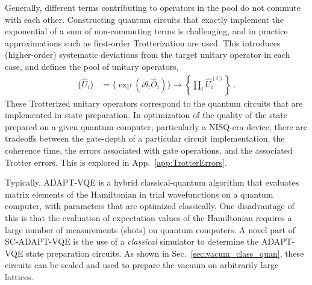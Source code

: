 \documentclass[aps, pra, onecolumn, tightenlines, letterpaper, amsmath, amssymb, preprintnumbers, floatfix, longbibliography, nofootinbib]{revtex4-2}
\begin{document}
Generally,
different terms contributing to operators
in the pool 
do not commute with each other.
Constructing quantum circuits that exactly implement the exponential of a sum of non-commuting terms is challenging, and in practice approximations such as first-order Trotterization are used.
This introduces (higher-order) systematic deviations from the target unitary operator in each case, and 
defines the pool of unitary operators,
%
\begin{align}
     \{ \hat{U}_i \} & = \{ {\exp}(i \theta_i \hat{O}_i) \}\rightarrow \left \{ \prod\limits_t \hat{U}_i^{(t)} \right \}
    \ .
    \label{eq:TrotOp}
\end{align}
%
These Trotterized unitary operators correspond to the quantum circuits 
that are implemented in state preparation.
In optimization of the quality of the state prepared on a given quantum computer, 
particularly a NISQ-era device,
there are tradeoffs between the gate-depth of a particular circuit implementation, 
the coherence time, 
the errors associated with gate operations, 
and the associated Trotter errors.
This is explored in App.~\ref{app:TrotterErrors}.


Typically, ADAPT-VQE is a hybrid classical-quantum algorithm that evaluates matrix elements of the Hamiltonian 
in trial wavefunctions on a quantum computer, with parameters that are optimized classically.
One disadvantage of this is that the evaluation of expectation values of the Hamiltonian requires a large number of measurements (shots) on quantum computers.
A novel part of SC-ADAPT-VQE is the use of a {\it classical} simulator to determine the ADAPT-VQE state preparation circuits.
As shown in Sec.~\ref{sec:vacum_class_quan}, these circuits can be scaled and used to prepare the vacuum on arbitrarily large lattices.





\end{document}

